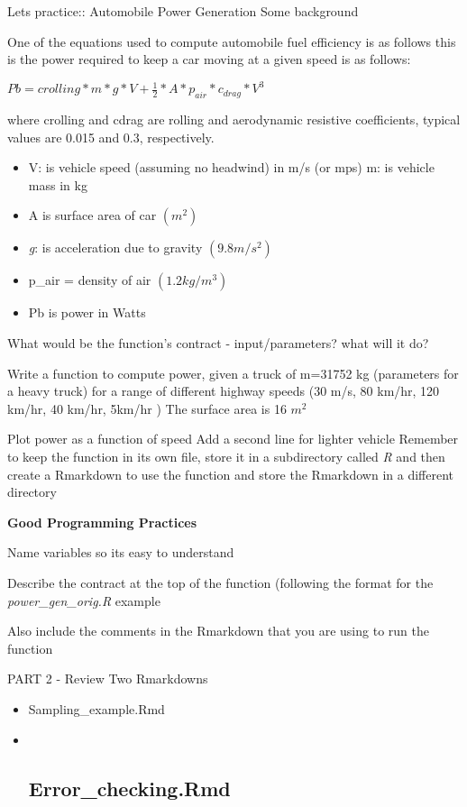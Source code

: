 \documentclass[
  ignorenonframetext,
]{beamer}
\begin{document}
\begin{frame}{{ Lets practice:: Automobile Power Generation }}
\protect\hypertarget{lets-practice-automobile-power-generation}{}
Some background

One of the equations used to compute automobile fuel efficiency is as
follows this is the power required to keep a car moving at a given speed
is as follows:

\(Pb = crolling * m *g *V + \frac{1}{2} * A*p_{air}*c_{drag}*V^3\)

where crolling and cdrag are rolling and aerodynamic resistive
coefficients, typical values are 0.015 and 0.3, respectively.

\begin{itemize}
\item
  V: is vehicle speed (assuming no headwind) in m/s (or mps) m: is
  vehicle mass in kg
\item
  A is surface area of car \((m^2)\)
\item
  \emph{g}: is acceleration due to gravity \((9.8 m/s^2 )\)
\item
  p\_air = density of air \((1.2kg/m^3 )\)
\item
  Pb is power in Watts
\end{itemize}

What would be the function's contract - input/parameters? what will it
do?

Write a function to compute power, given a truck of m=31752 kg
(parameters for a heavy truck) for a range of different highway speeds
(30 m/s, 80 km/hr, 120 km/hr, 40 km/hr, 5km/hr ) The surface area is 16
\(m^2\)

Plot power as a function of speed Add a second line for lighter vehicle
Remember to keep the function in its own file, store it in a
subdirectory called \emph{R} and then create a Rmarkdown to use the
function and store the Rmarkdown in a different directory

\textbf{Good Programming Practices}

Name variables so its easy to understand

Describe the contract at the top of the function (following the format
for the \emph{power\_gen\_orig.R} example

Also include the comments in the Rmarkdown that you are using to run the
function
\end{frame}

\begin{frame}{{ PART 2 - Review Two Rmarkdowns }}
\protect\hypertarget{part-2---review-two-rmarkdowns}{}
\begin{itemize}
\item
  Sampling\_example.Rmd
\item ~
  \hypertarget{error_checking.rmd}{%
  \subsection{Error\_checking.Rmd}\label{error_checking.rmd}}
\end{itemize}
\end{frame}
\end{document}
